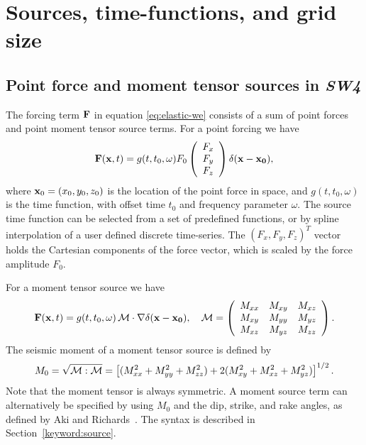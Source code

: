 \documentclass[11pt]{report}
\begin{document}
\chapter{Sources, time-functions, and grid size}


\section{Point force and moment tensor sources in \emph{SW4}}\label{sec:time-functions}
The forcing term ${\bf F}$ in equation \eqref{eq:elastic-we} consists of a sum of point forces and
point moment tensor source terms. For a point forcing we have
\[
{\bf F}({\bf x},t) = g(t,t_0,\omega) F_0 \left(\begin{array}{c}
  F_x\\ F_y\\ F_z\end{array}\right) \delta ({\bf x} - {\bf x_0}),
\]
where ${\bf x}_0=(x_0,y_0,z_0)$ is the location of the point force in space, and $g(t,t_0,\omega)$
is the time function, with offset time $t_0$ and frequency parameter $\omega$. The source time
function can be selected from a set of predefined functions, or by spline interpolation of a user
defined discrete time-series. The $(F_x,F_y,F_z)^T$ vector holds the Cartesian components of the force
vector, which is scaled by the force amplitude $F_0$. 

For a moment tensor source we have
\[
{\bf F}({\bf x},t) = g(t,t_0,\omega)\, {\cal  M} \cdot \nabla \delta ({\bf x} - {\bf
  x_0}), \quad 
{\cal M} = \left(\begin{array}{ccc}
M_{xx} & M_{xy} & M_{xz}\\
M_{xy} & M_{yy} & M_{yz}\\
M_{xz} & M_{yz} & M_{zz}
\end{array}
\right).
\]
The seismic moment of a moment tensor source is defined by 
\[
M_0 = \sqrt{{\cal M}:{\cal M}} = \left[ (M_{xx}^2 + M_{yy}^2 + M_{zz}^2 ) + 2 (M_{xy}^2 + M_{xz}^2 + M_{yz}^2) \right]^{1/2}.
\]
Note that the moment tensor is always symmetric. A moment source term can alternatively be specified
by using $M_0$ and the dip, strike, and rake angles, as defined by Aki and
Richards~\cite{Aki-Richards-02}. The syntax is described in Section~\ref{keyword:source}.
\end{document}
